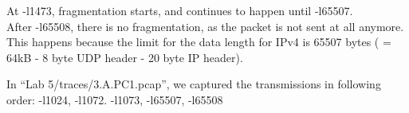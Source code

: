 At -l1473, fragmentation starts, and continues to happen until -l65507. \\ 
After -l65508, there is no fragmentation, as the packet is not sent at all anymore. \\
This happens because the limit for the data length for IPv4 is 65507 bytes ( = 64kB - 8 byte UDP header - 20 byte IP header).

In ``Lab 5/traces/3.A.PC1.pcap'', we captured the transmissions in following order: -l1024, -l1072. -l1073, -l65507, -l65508
